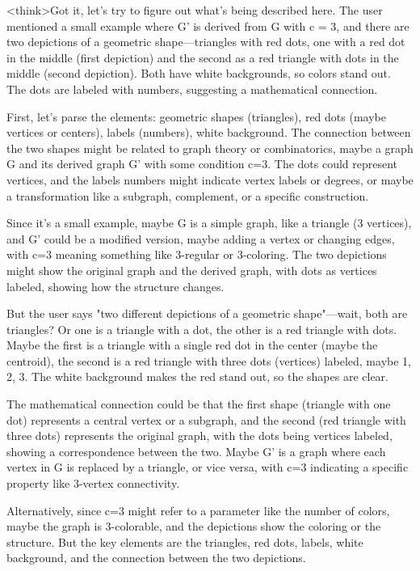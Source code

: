 <think>Got it, let's try to figure out what's being described here. The user mentioned a small example where G' is derived from G with c = 3, and there are two depictions of a geometric shape—triangles with red dots, one with a red dot in the middle (first depiction) and the second as a red triangle with dots in the middle (second depiction). Both have white backgrounds, so colors stand out. The dots are labeled with numbers, suggesting a mathematical connection.

First, let's parse the elements: geometric shapes (triangles), red dots (maybe vertices or centers), labels (numbers), white background. The connection between the two shapes might be related to graph theory or combinatorics, maybe a graph G and its derived graph G' with some condition c=3. The dots could represent vertices, and the labels numbers might indicate vertex labels or degrees, or maybe a transformation like a subgraph, complement, or a specific construction.

Since it's a small example, maybe G is a simple graph, like a triangle (3 vertices), and G' could be a modified version, maybe adding a vertex or changing edges, with c=3 meaning something like 3-regular or 3-coloring. The two depictions might show the original graph and the derived graph, with dots as vertices labeled, showing how the structure changes.

But the user says "two different depictions of a geometric shape"—wait, both are triangles? Or one is a triangle with a dot, the other is a red triangle with dots. Maybe the first is a triangle with a single red dot in the center (maybe the centroid), the second is a red triangle with three dots (vertices) labeled, maybe 1, 2, 3. The white background makes the red stand out, so the shapes are clear.

The mathematical connection could be that the first shape (triangle with one dot) represents a central vertex or a subgraph, and the second (red triangle with three dots) represents the original graph, with the dots being vertices labeled, showing a correspondence between the two. Maybe G' is a graph where each vertex in G is replaced by a triangle, or vice versa, with c=3 indicating a specific property like 3-vertex connectivity.

Alternatively, since c=3 might refer to a parameter like the number of colors, maybe the graph is 3-colorable, and the depictions show the coloring or the structure. But the key elements are the triangles, red dots, labels, white background, and the connection between the two depictions.

